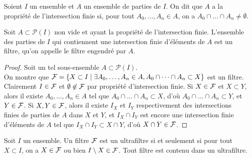 \begin{defi}
Soient $I$ un ensemble et $A$ un ensemble de parties de $I$. On dit que $A$ a la propriété de l'intersection finie si,
pour tout $A_0,\dots,A_n \in A$, on a $A_0 \cap \dots \cap A_n \ne \emptyset$.
\end{defi}

\begin{prop}
Soit $A \subset \mathcal{P}(I)$ non vide et ayant la propriété de l'intersection finie. L'ensemble des parties de $I$ qui contiennent une intersection finie 
d'éléments de $A$ est un filtre, qu'on appelle le filtre engendré par $A$.
\end{prop}

\begin{proof}
Soit un tel sous-ensemble $A \subset \mathcal{P}(I)$.\\ On montre que $ \mathcal{F} = \{ X \subset I \mid \exists A_0,\dots,A_n \in A, A_0 \cap \dots \cap A_n \subset X \}$ est un filtre.
Clairement $I \in \mathcal{F}$ et $\emptyset \not\in \mathcal{F}$ par propriété d'intersection finie. Si $X \in \mathcal{F}$ et $X \subset Y$, alors il existe $A_0,\dots,A_n \in A$
tel que $A_0 \cap \dots \cap A_n \subset X$, d'où $A_0 \cap \dots \cap A_n \subset Y$, et $Y \in \mathcal{F}$. Si $X,Y \in \mathcal{F}$, alors il existe $I_X$ et $I_Y$ respectivement
des intersections finies de parties de $A$ dans $X$ et $Y$, et $I_X \cap I_Y$ est encore une intersection finie d'éléments de $A$ tel que $I_X \cap I_Y \subset X \cap Y$,
d'où $X \cap Y \in \mathcal{F}$.
\end{proof}

\begin{prop}\label{lemmelos}
Soit $I$ un ensemble. Un filtre $\mathcal{F}$ est un ultrafiltre si et seulement si pour tout $X \subset I$, on a $X \in \mathcal{F}$ ou bien $I \setminus X \in \mathcal{F}$.
Tout filtre est contenu dans un ultrafiltre.
\end{prop}

